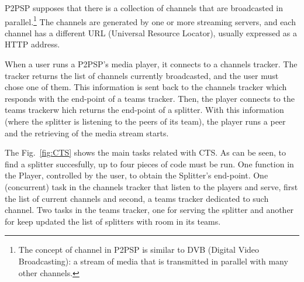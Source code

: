 \label{sec:CTS}
\begin{figure*}
   \caption{Tasks involved in the process of
    determing the corresponding team tracker of a given
    channel.\label{fig:CTS}}
\end{figure*}
P2PSP supposes that there is a collection of channels that are
broadcasted in parallel.\footnote{The concept of channel in P2PSP is
  similar to DVB (Digital Video Broadcasting): a stream of media that
  is transmitted in parallel with many other channels.} The channels
are generated by one or more streaming servers, and each channel has a
different URL (Universal Resource Locator), usually expressed as a
HTTP address.

When a user runs a P2PSP's media player, it connects to a channels
tracker. The tracker returns the list of channels currently
broadcasted, and the user must chose one of them. This information is
sent back to the channels tracker which responds with the end-point of
a teams tracker. Then, the player connects to the teams trackerw hich
returns the end-point of a splitter. With this information (where the
splitter is listening to the peers of its team), the player runs a
peer and the retrieving of the media stream starts.

The Fig.~\ref{fig:CTS} shows the main tasks related with CTS. As can
be seen, to find a splitter succesfully, up to four pieces of code
must be run. One function in the Player, controlled by the user, to
obtain the Splitter's end-point. One (concurrent) task in the channels
tracker that listen to the players and serve, first the list of
current channels and second, a teams tracker dedicated to such
channel. Two tasks in the teams tracker, one for serving the splitter
and another for keep updated the list of splitters with room in its
teams.
